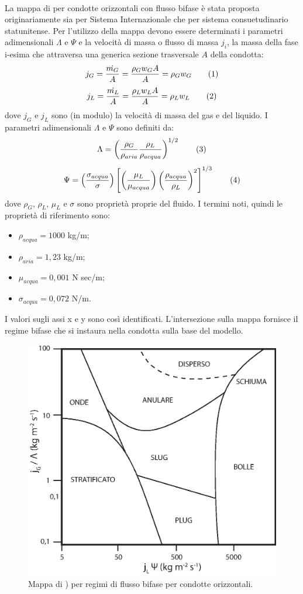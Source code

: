 \paragraph{\textcite{baker1954simultaneous}}
La mappa di \textcite{baker1954simultaneous} per condotte orizzontali con flusso bifase  è stata proposta originariamente sia per Sistema Internazionale che per sistema consuetudinario statunitense. Per l'utilizzo della mappa devono essere determinati i parametri adimensionali \(\Lambda\) e \(\Psi\) e la velocità di massa o flusso di massa \(j_i\), la massa della fase i-esima che attraversa una generica sezione trasversale \(A\) della condotta:
\[j_G = \frac{\dot{m_G}}{A}=\frac{\rho_G w_G A}{A}=\rho_G w_G \addtag\]
\[j_L = \frac{\dot{m_L}}{A}=\frac{\rho_L w_L A}{A}=\rho_L w_L \addtag\]
dove \(j_G\) e \(j_L\) sono (in modulo) la velocità di massa del gas e del liquido. I parametri adimensionali \(\Lambda\) e \(\Psi\) sono definiti da:
\[\Lambda= \left(\dfrac{\rho_G}{\rho_{aria}} \dfrac{\rho_L}{\rho_{acqua}}\right)^{1/2} \addtag \label{eq:lambdabaker} \]
\[\Psi=\left( \frac{\sigma_{acqua}}{\sigma} \right) \left[ \left( \frac{\mu_L}{\mu_{acqua}} \right) \left( \frac{\rho_{acqua}}{\rho_L} \right)^2 \right]^{1/3} \addtag \]
dove \(\rho_G\), \(\rho_L\), \(\mu_L\) e \(\sigma\) sono proprietà proprie del fluido. I termini noti, quindi le proprietà di riferimento sono:
\begin{itemize}
    \item \(\rho_{acqua}=1000\) kg/m;
    \item \(\rho_{aria}=1,23\) kg/m;
    \item \(\mu_{acqua}=0,001\) N sec/m;
    \item \(\sigma_{acqua}=0,072\) N/m.
\end{itemize}
I valori sugli assi x e y sono così identificati. L'intersezione sulla mappa fornisce il regime bifase che si instaura nella condotta sulla base del modello.
\begin{figure}[htbp]
    \centering
    \includegraphics[width=.6\textwidth]{fig/fluidodinamica/baker.eps}
    \caption{Mappa di \textcite{baker1954simultaneous}) per regimi di flusso bifase per condotte orizzontali.}
    \label{fig:baker}
\end{figure}


